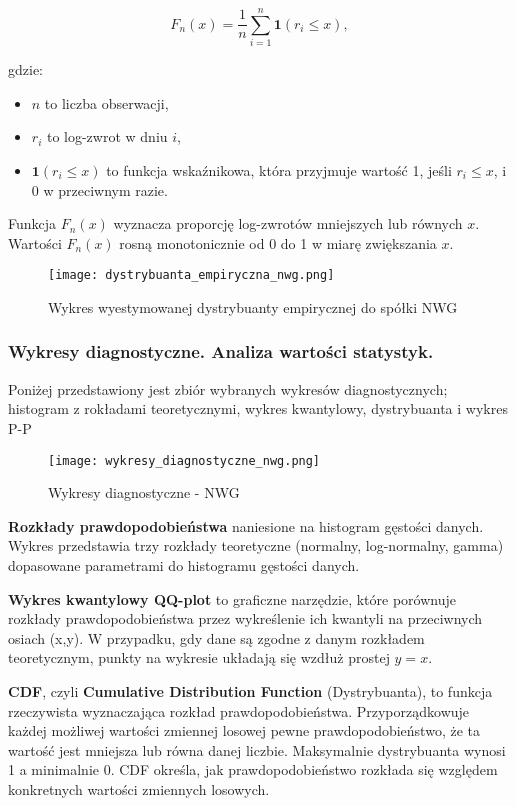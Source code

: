 \documentclass[a4paper,11pt]{article}
\begin{document}
\[
F_n(x) = \frac{1}{n} \sum_{i=1}^n \mathbf{1}(r_i \leq x),
\]

gdzie:
\begin{itemize}
    \item \( n \) to liczba obserwacji,
    \item \( r_i \) to log-zwrot w dniu \( i \),
    \item \( \mathbf{1}(r_i \leq x) \) to funkcja wskaźnikowa, która przyjmuje wartość 1, jeśli \( r_i \leq x \), i 0 w przeciwnym razie.
\end{itemize}

Funkcja \( F_n(x) \) wyznacza proporcję log-zwrotów mniejszych lub równych \( x \). Wartości \( F_n(x) \) rosną monotonicznie od 0 do 1 w miarę zwiększania \( x \).

\begin{figure}[h]
\centering
\texttt{[image: dystrybuanta\_empiryczna\_nwg.png]}
\caption{Wykres wyestymowanej dystrybuanty empirycznej do spółki NWG}
\end{figure}





\subsubsection{Wykresy diagnostyczne. Analiza wartości statystyk.}
Poniżej przedstawiony jest zbiór wybranych wykresów diagnostycznych; histogram z rokładami teoretycznymi, wykres kwantylowy, dystrybuanta i wykres P-P
\begin{figure}[h]
\centering
\texttt{[image: wykresy\_diagnostyczne\_nwg.png]}
\caption{Wykresy diagnostyczne - NWG}
\end{figure}

\textbf{Rozkłady prawdopodobieństwa} naniesione na histogram gęstości danych. Wykres przedstawia trzy rozkłady teoretyczne (normalny, log-normalny, gamma) dopasowane parametrami do histogramu gęstości danych. 

\textbf{Wykres kwantylowy QQ-plot} to graficzne narzędzie, które porównuje rozkłady prawdopodobieństwa przez wykreślenie ich kwantyli na przeciwnych osiach (x,y). W przypadku, gdy dane są zgodne z danym rozkładem teoretycznym, punkty na wykresie układają się wzdłuż prostej \(y = x\).

\textbf{CDF}, czyli \textbf{Cumulative Distribution Function} (Dystrybuanta), to funkcja rzeczywista wyznaczająca rozkład prawdopodobieństwa. Przyporządkowuje każdej możliwej wartości zmiennej losowej pewne prawdopodobieństwo, że ta wartość jest mniejsza lub równa danej liczbie. Maksymalnie dystrybuanta wynosi 1 a minimalnie 0. CDF określa, jak prawdopodobieństwo rozkłada się względem konkretnych wartości zmiennych losowych.
\end{document}
